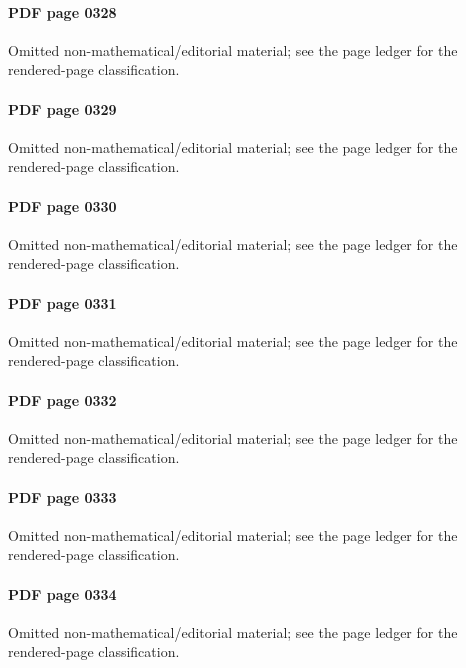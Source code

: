 \paragraph{PDF page 0328}\uses{}\label{mcrt-omitted-p0328} Omitted non-mathematical/editorial material; see the page ledger for the rendered-page classification.\par
\paragraph{PDF page 0329}\uses{}\label{mcrt-omitted-p0329} Omitted non-mathematical/editorial material; see the page ledger for the rendered-page classification.\par
\paragraph{PDF page 0330}\uses{}\label{mcrt-omitted-p0330} Omitted non-mathematical/editorial material; see the page ledger for the rendered-page classification.\par
\paragraph{PDF page 0331}\uses{}\label{mcrt-omitted-p0331} Omitted non-mathematical/editorial material; see the page ledger for the rendered-page classification.\par
\paragraph{PDF page 0332}\uses{}\label{mcrt-omitted-p0332} Omitted non-mathematical/editorial material; see the page ledger for the rendered-page classification.\par
\paragraph{PDF page 0333}\uses{}\label{mcrt-omitted-p0333} Omitted non-mathematical/editorial material; see the page ledger for the rendered-page classification.\par
\paragraph{PDF page 0334}\uses{}\label{mcrt-omitted-p0334} Omitted non-mathematical/editorial material; see the page ledger for the rendered-page classification.\par
